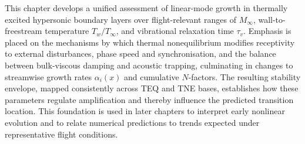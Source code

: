 This chapter develops a unified assessment of linear-mode growth in thermally excited hypersonic boundary layers over flight-relevant ranges of \(M_\infty\), wall-to-freestream temperature \(T_w/T_\infty\), and vibrational relaxation time \(\tau_v\). Emphasis is placed on the mechanisms by which thermal nonequilibrium modifies receptivity to external disturbances, phase speed and synchronisation, and the balance between bulk-viscous damping and acoustic trapping, culminating in changes to streamwise growth rates \(\alpha_i(x)\) and cumulative \(N\)-factors. The resulting stability envelope, mapped consistently across \gls{TEQ} and \gls{TNE} bases, establishes how these parameters regulate amplification and thereby influence the predicted transition location. This foundation is used in later chapters to interpret early nonlinear evolution and to relate numerical predictions to trends expected under representative flight conditions.











